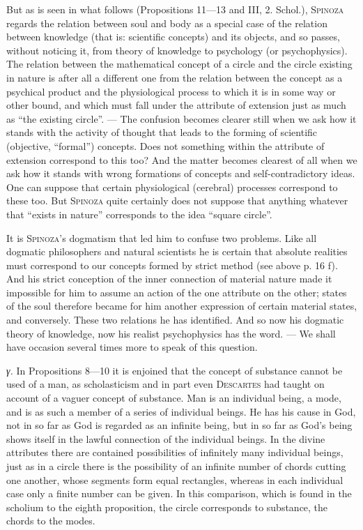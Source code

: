 \documentclass[12pt]{article}
\newcommand{\opage}[1]{\marginnote{\footnotesize\textit{[#1]}}}
\begin{document}
But as is seen in what follows (Propositions 11---13 and III, 2. Schol.), \textsc{Spinoza}
regards the relation between soul and body as a special case of the relation between
knowledge (that is: scientific concepts) and its objects, and so passes, without noticing
it, from theory of knowledge to psychology (or psychophysics). The relation between the
mathematical concept of a circle and the circle existing in nature is after all a different
one from the relation between the concept as a psychical product and the physiological
process to which it is in some way or other bound, and which must fall under the attribute of
extension just as much as ``the existing circle''. --- The confusion becomes clearer still
when we ask how it stands with the activity of thought that leads to the forming of
scientific (objective, ``formal'') concepts. Does not something within the attribute of
extension correspond to this too? And the matter becomes clearest of all when we ask how it
stands with wrong formations of concepts and self-contradictory ideas. One can suppose that
certain physiological (cerebral) processes correspond to these too. But \textsc{Spinoza}
quite certainly does not suppose that anything whatever that ``exists in nature'' corresponds
to the idea ``square circle''.

It is \textsc{Spinoza}'s dogmatism that led him to confuse two problems. Like all dogmatic
philosophers and natural scientists he is certain that absolute realities must correspond
to our concepts formed by strict method (see above p. 16 f). And his strict conception of the
inner connection of material nature made it impossible for him to assume an action of the
one attribute on the other; states of the soul therefore became for him another expression
of certain material states, and conversely. These two relations he has identified. And so
now his dogmatic theory of knowledge, now his realist psychophysics has the word. --- We
shall have occasion several times more to speak of this question.

\textit{γ.} In Propositions 8---10 it is enjoined that the concept of substance cannot be
used of a man, as scholasticism and in part even \textsc{Descartes} had taught on account of
a vaguer concept of substance. Man is an individual being, a mode, and is as such a member
of a series of individual beings. He has his cause in God, not in so far as God is regarded
as an infinite being, but in so far as God's being shows itself in the lawful connection of
the individual beings. In the divine attributes there are contained possibilities of
infinitely many individual beings, just as in a circle there is the possibility of an
infinite number of chords cutting one another, whose \opage{42}segments form equal
rectangles, whereas in each individual case only a finite number can be given. In this
comparison, which is found in the scholium to the eighth proposition, the circle corresponds
to substance, the chords to the modes.
\end{document}
